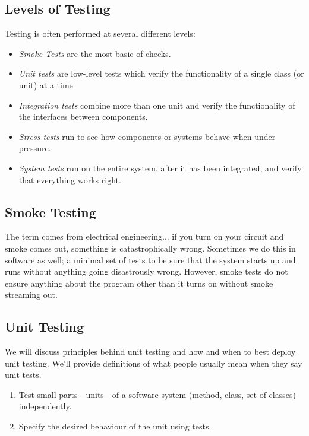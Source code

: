 \subsection*{Levels of Testing}
Testing is often performed at several different levels:
\begin{itemize}
\item \emph{Smoke Tests} are the most basic of checks.
\item \emph{Unit tests} are low-level tests which verify the functionality of
a single class (or unit) at a time.
\item \emph{Integration tests} combine more than one unit and verify the
functionality of the interfaces between components.
\item \emph{Stress tests} run to see how components or systems behave when under pressure.
\item \emph{System tests} run on the entire system, after it has been
integrated, and verify that everything works right.
\end{itemize}

\subsection*{Smoke Testing}
The term comes from electrical engineering... if you turn on your circuit and smoke comes out, something is catastrophically wrong. Sometimes we do this in software as well; a minimal set of tests to be sure that the system starts up and runs without anything going disastrously wrong. However, smoke tests do not ensure anything about the program other than it turns on without smoke streaming out.

\subsection*{Unit Testing}

We will discuss principles behind unit testing
and how and when to best deploy unit testing. We'll provide definitions
of what people usually mean when they say unit tests.

\begin{enumerate}
\item Test small parts---units---of a software system (method, class, set of classes) independently.
\item Specify the desired behaviour of the unit using tests.
\end{enumerate}

